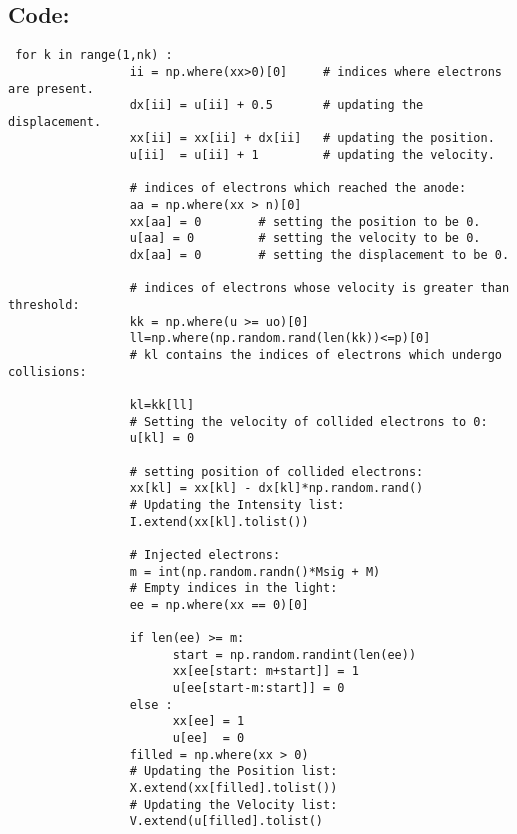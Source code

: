 \documentclass[11pt, a4paper, twoside]{article}
\begin{document}
\subsection*{Code:}
\begin{verbatim}
 for k in range(1,nk) :
                 ii = np.where(xx>0)[0]     # indices where electrons are present.                  
                 dx[ii] = u[ii] + 0.5       # updating the displacement.                 
                 xx[ii] = xx[ii] + dx[ii]   # updating the position.                 
                 u[ii]  = u[ii] + 1         # updating the velocity.
                 
                 # indices of electrons which reached the anode:
                 aa = np.where(xx > n)[0]                     
                 xx[aa] = 0        # setting the position to be 0.                           
                 u[aa] = 0         # setting the velocity to be 0.                          
                 dx[aa] = 0        # setting the displacement to be 0.                           

                 # indices of electrons whose velocity is greater than threshold:
                 kk = np.where(u >= uo)[0]                    
                 ll=np.where(np.random.rand(len(kk))<=p)[0] 
                 # kl contains the indices of electrons which undergo collisions:

                 kl=kk[ll] 
                 # Setting the velocity of collided electrons to 0:                 
                 u[kl] = 0                                    

                 # setting position of collided electrons: 
                 xx[kl] = xx[kl] - dx[kl]*np.random.rand()
                 # Updating the Intensity list:
                 I.extend(xx[kl].tolist())   
                 
                 # Injected electrons:   
                 m = int(np.random.randn()*Msig + M)
                 # Empty indices in the light:
                 ee = np.where(xx == 0)[0]                    
                 
                 if len(ee) >= m:                             
                       start = np.random.randint(len(ee)) 
                       xx[ee[start: m+start]] = 1
                       u[ee[start-m:start]] = 0         
                 else :
                       xx[ee] = 1                            
                       u[ee]  = 0
                 filled = np.where(xx > 0)
                 # Updating the Position list:
                 X.extend(xx[filled].tolist()) 
                 # Updating the Velocity list:               
                 V.extend(u[filled].tolist()
\end{verbatim}
\end{document}
